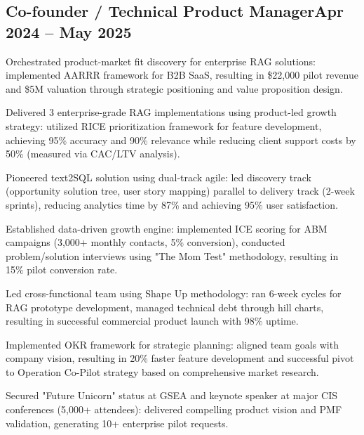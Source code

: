 \documentclass[a4paper,12pt]{article}
\begin{document}
\subsection{{Co-founder / Technical Product Manager}\hfill Apr 2024 -- May 2025}
\begin{zitemize}
\item Orchestrated product-market fit discovery for enterprise RAG solutions: implemented AARRR framework for B2B SaaS, resulting in \$22,000 pilot revenue and \$5M valuation through strategic positioning and value proposition design.
\item Delivered 3 enterprise-grade RAG implementations using product-led growth strategy: utilized RICE prioritization framework for feature development, achieving 95\% accuracy and 90\% relevance while reducing client support costs by 50\% (measured via CAC/LTV analysis).
\item Pioneered text2SQL solution using dual-track agile: led discovery track (opportunity solution tree, user story mapping) parallel to delivery track (2-week sprints), reducing analytics time by 87\% and achieving 95\% user satisfaction.
\item Established data-driven growth engine: implemented ICE scoring for ABM campaigns (3,000+ monthly contacts, 5\% conversion), conducted problem/solution interviews using "The Mom Test" methodology, resulting in 15\% pilot conversion rate.
\item Led cross-functional team using Shape Up methodology: ran 6-week cycles for RAG prototype development, managed technical debt through hill charts, resulting in successful commercial product launch with 98\% uptime.
\item Implemented OKR framework for strategic planning: aligned team goals with company vision, resulting in 20\% faster feature development and successful pivot to Operation Co-Pilot strategy based on comprehensive market research.
\item Secured "Future Unicorn" status at GSEA and keynote speaker at major CIS conferences (5,000+ attendees): delivered compelling product vision and PMF validation, generating 10+ enterprise pilot requests.
\end{zitemize}


\vspace*{6pt}
\end{document}
